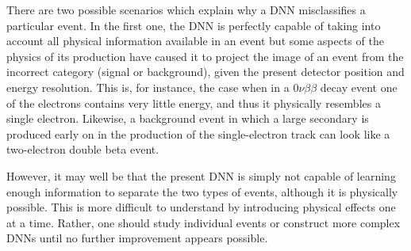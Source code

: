 \documentclass[a4paper,11pt]{article}
\begin{document}
There are two possible scenarios which explain why a DNN misclassifies a particular event. In the first one, the DNN is perfectly capable of taking into account all physical information available in an event but some aspects of the physics of its production have caused it to project the image of an event from the incorrect category (signal or background), given the present detector position and energy resolution. This is, for instance, the case when in a $0\nu\beta\beta$ decay event one of the electrons contains very little energy, and thus it physically resembles a single electron. Likewise, a background event in which a large secondary is produced early on in the production of the single-electron track can look like a two-electron double beta event.

However, it may well be that the present DNN is simply not capable of learning enough information to separate the two types of events, although it is physically possible. This is more difficult to understand by introducing physical effects one at a time. Rather, one should study individual events or construct more complex DNNs until no further improvement appears possible.
\end{document}
